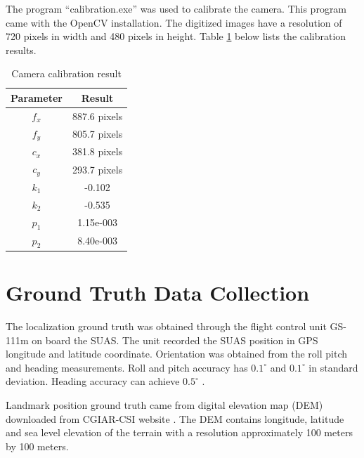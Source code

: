 The program ``calibration.exe'' was used to calibrate the camera. This program came with the OpenCV installation. The digitized images have a resolution of 720 pixels in width and 480 pixels in height. Table \ref{tab:camcalresult} below lists the calibration results.

\begin{table}[h]
\caption{Camera calibration result}
\label{tab:camcalresult}
\centering
\begin{tabular}{|c|c|}
\hline
Parameter & Result\\ \hline
$f_x$ & 887.6 pixels \\ \hline
$f_y$ & 805.7 pixels\\ \hline
$c_x$ & 381.8 pixels\\ \hline
$c_y$ & 293.7 pixels\\ \hline
$k_1$ & -0.102 \\ \hline
$k_2$ & -0.535 \\ \hline
$p_1$ & 1.15e-003 \\ \hline
$p_2$ & 8.40e-003 \\
\hline
\end{tabular}
\end{table}
\FloatBarrier

\section{Ground Truth Data Collection}
The localization ground truth was obtained through the flight
control unit GS-111m on board the SUAS. The unit recorded the SUAS
position in GPS longitude and latitude coordinate. Orientation was
obtained from the roll pitch and heading measurements. Roll and pitch
accuracy has $0.1^\circ$ and $0.1^\circ$ in standard deviation.
Heading accuracy can achieve $0.5^\circ$ \cite{_athena_????}.

Landmark position ground truth came from digital elevation map (DEM)
downloaded from CGIAR-CSI website \cite{_cgiar-csi_????}. The DEM
contains longitude, latitude and sea level elevation of the terrain
with a resolution approximately 100 meters by 100 meters. 



